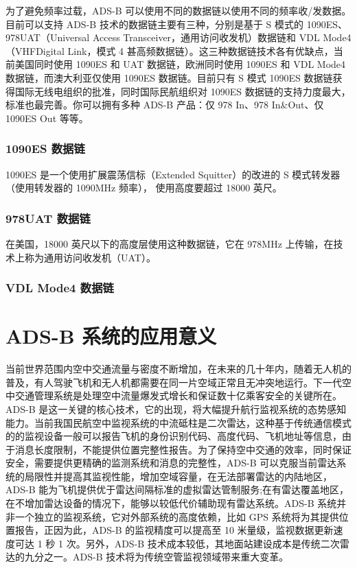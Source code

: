 为了避免频率过载，ADS-B 可以使用不同的数据链以使用不同的频率收/发数据。目前可以支持 ADS-B 技术的数据链主要有三种，分别是基于 S 模式的 1090ES、978UAT（Universal Access Transceiver，通用访问收发机）数据链和 VDL Mode4（VHFDigital Link，模式 4 甚高频数据链）。这三种数据链技术各有优缺点，当前美国同时使用 1090ES 和 UAT 数据链，欧洲同时使用 1090ES 和 VDL Mode4 数据链，而澳大利亚仅使用 1090ES 数据链。目前只有 S 模式 1090ES 数据链获得国际无线电组织的批准，同时国际民航组织对 1090ES 数据链的支持力度最大，标准也最完善。你可以拥有多种 ADS-B 产品：仅 978 In、978 In\&Out、仅 1090ES Out 等等。

\subsubsection{1090ES 数据链}

1090ES 是一个使用扩展震荡信标（Extended Squitter）的改进的 S 模式转发器（使用转发器的 1090MHz 频率），
使用高度要超过 18000 英尺。

\subsubsection{978UAT 数据链}

在美国，18000 英尺以下的高度层使用这种数据链，它在 978MHz 上传输，在技术上称为通用访问收发机（UAT）。

\subsubsection{VDL Mode4 数据链}

\section{ADS-B 系统的应用意义}

当前世界范围内空中交通流量与密度不断增加，在未来的几十年内，随着无人机的普及，有人驾驶飞机和无人机都需要在同一片空域正常且无冲突地运行。下一代空中交通管理系统是处理空中流量爆发式增长和保证数十亿乘客安全的关键所在。ADS-B 是这一关键的核心技术，它的出现，将大幅提升航行监视系统的态势感知能力。当前我国民航空中监视系统的中流砥柱是二次雷达，这种基于传统通信模式的的监视设备一般可以报告飞机的身份识别代码、高度代码、飞机地址等信息，由于消息长度限制，不能提供位置完整性报告。为了保持空中交通的效率，同时保证安全，需要提供更精确的监测系统和消息的完整性，ADS-B 可以克服当前雷达系统的局限性并提高其监视性能，增加空域容量，在无法部署雷达的内陆地区，ADS-B 能为飞机提供优于雷达间隔标准的虚拟雷达管制服务;在有雷达覆盖地区，在不增加雷达设备的情况下，能够以较低代价辅助现有雷达系统。ADS-B 系统并非一个独立的监视系统，它对外部系统的高度依赖，比如 GPS 系统将为其提供位置报告，正因为此，ADS-B 的监视精度可以提高至 10 米量级，监视数据更新速度可达 1 秒 1 次。另外，ADS-B 技术成本较低，其地面站建设成本是传统二次雷达的九分之一。ADS-B 技术将为传统空管监视领域带来重大变革。

